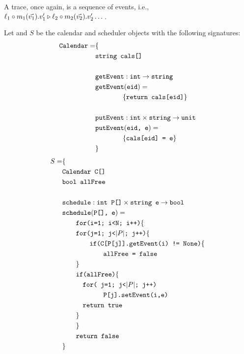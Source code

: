 \documentclass[acmsmall,screen,review, nonacm]{acmart}
\begin{document}
A trace, once again, is a sequence of events, i.e., $\ell_1 \circ m_1(\vec{v_1}).v'_1  \triangleright \ell_2 \circ m_2(\vec{v_2}).v'_2  \dots $.
\begin{example} \label{ex:calendar}
  Let  and $S$ be the calendar and scheduler objects with the following signatures:
  \begin{align*}
    \texttt{Calendar} = & \{ \\
    & \texttt{string} \texttt{ cals[]} \\
    \\
    & \texttt{getEvent}: \texttt{int} \to \texttt{string} \\
    & \texttt{getEvent} (\texttt{eid}) =  \\
    & \qquad \qquad \{ \texttt{return cals[eid]} \}\\
    \\
    & \texttt{putEvent}: \texttt{int} \times \texttt{string} \to  \texttt{unit}\\
    & \texttt{putEvent} (\texttt{eid, e}) =  \\
    & \qquad \qquad \{ \texttt{cals[eid] = e} \} \\
    &\}
  \end{align*}
  \begin{align*}
    S = &\{ \\
    & \texttt{Calendar} \texttt{ C[]} \\
    & \texttt{bool} \texttt{ allFree} \\
    \\
    & \texttt{schedule}: \texttt{int P[]} \times \texttt{string e} \to  \texttt{bool}\\
    & \texttt{schedule} (\texttt{P[], e}) =  \\
    &  ~~~~~~\texttt{for(i=1; i<N; i++)} \{ \\
    &  \quad \quad \texttt{for(j=1; j<\ensuremath{|P|}; j++)} \{ \\
    & \qquad \qquad \texttt{if(C[P[j]].getEvent(i) != None)} \{ \\
    & \qquad \qquad \qquad \texttt{allFree = false} \\
    & \quad \quad \} \\
    & \quad \quad \texttt{if(allFree)} \{ \\
    & \quad \quad \quad \texttt{for( j=1; j<\ensuremath{|P|}; j++)} \\
    & \qquad \quad \quad \qquad \texttt{P[j].setEvent(i,e)} \\
    & \quad \quad \quad \texttt{return true} \\
    & \quad \quad  \} \\
    & ~~~~~~ \} \\
    & ~~~~~~\texttt{return false} \\
    & \}
   \end{align*}
\end{example}
\end{document}
